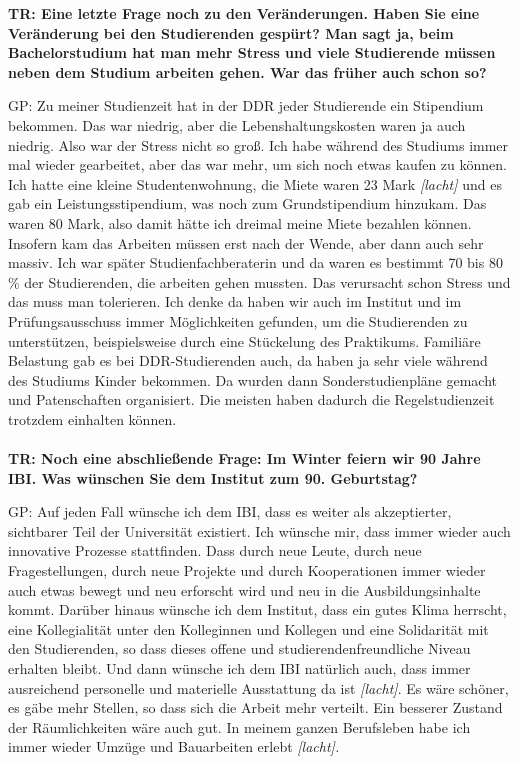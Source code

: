 \documentclass[a4paper,
fontsize=11pt,
oneside,
numbers=noperiodatend,
parskip=half-,
bibliography=totoc,
final
]{scrartcl}
\begin{document}
\textbf{TR: Eine letzte Frage noch zu den Veränderungen. Haben Sie eine
Veränderung bei den Studierenden gespürt? Man sagt ja, beim
Bachelorstudium hat man mehr Stress und viele Studierende müssen neben
dem Studium arbeiten gehen. War das früher auch schon so?\\
}

GP: Zu meiner Studienzeit hat in der DDR jeder Studierende ein
Stipendium bekommen. Das war niedrig, aber die Lebenshaltungskosten
waren ja auch niedrig. Also war der Stress nicht so groß. Ich habe
während des Studiums immer mal wieder gearbeitet, aber das war mehr, um
sich noch etwas kaufen zu können. Ich hatte eine kleine
Studentenwohnung, die Miete waren 23 Mark \emph{{[}lacht{]}} und es gab
ein Leistungsstipendium, was noch zum Grundstipendium hinzukam. Das
waren 80 Mark, also damit hätte ich dreimal meine Miete bezahlen können.
Insofern kam das Arbeiten müssen erst nach der Wende, aber dann auch
sehr massiv. Ich war später Studienfachberaterin und da waren es
bestimmt 70 bis 80 \% der Studierenden, die arbeiten gehen mussten. Das
verursacht schon Stress und das muss man tolerieren. Ich denke da haben
wir auch im Institut und im Prüfungsausschuss immer Möglichkeiten
gefunden, um die Studierenden zu unterstützen, beispielsweise durch eine
Stückelung des Praktikums. Familiäre Belastung gab es bei
DDR-Studierenden auch, da haben ja sehr viele während des Studiums
Kinder bekommen. Da wurden dann Sonderstudienpläne gemacht und
Patenschaften organisiert. Die meisten haben dadurch die
Regelstudienzeit trotzdem einhalten können.\\
~\\
\textbf{TR: Noch eine abschließende Frage: Im Winter feiern wir 90 Jahre
IBI. Was wünschen Sie dem Institut zum 90. Geburtstag?}

GP: Auf jeden Fall wünsche ich dem IBI, dass es weiter als akzeptierter,
sichtbarer Teil der Universität existiert. Ich wünsche mir, dass immer
wieder auch innovative Prozesse stattfinden. Dass durch neue Leute,
durch neue Fragestellungen, durch neue Projekte und durch Kooperationen
immer wieder auch etwas bewegt und neu erforscht wird und neu in die
Ausbildungsinhalte kommt. Darüber hinaus wünsche ich dem Institut, dass
ein gutes Klima herrscht, eine Kollegialität unter den Kolleginnen und
Kollegen und eine Solidarität mit den Studierenden, so dass dieses
offene und studierendenfreundliche Niveau erhalten bleibt. Und dann
wünsche ich dem IBI natürlich auch, dass immer ausreichend personelle
und materielle Ausstattung da ist \emph{{[}lacht{]}}. Es wäre schöner,
es gäbe mehr Stellen, so dass sich die Arbeit mehr verteilt. Ein
besserer Zustand der Räumlichkeiten wäre auch gut. In meinem ganzen
Berufsleben habe ich immer wieder Umzüge und Bauarbeiten erlebt
\emph{{[}lacht{]}.}
\end{document}
